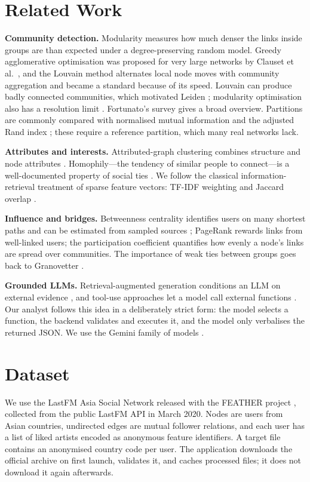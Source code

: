 \documentclass[conference]{IEEEtran}
\begin{document}
\section{Related Work}\label{sec:related}
\textbf{Community detection.} Modularity \cite{newman2006} measures how much denser the links inside groups are than expected under a degree-preserving random model. Greedy agglomerative optimisation was proposed for very large networks by Clauset et al.\ \cite{clauset2004}, and the Louvain method \cite{blondel2008} alternates local node moves with community aggregation and became a standard because of its speed. Louvain can produce badly connected communities, which motivated Leiden \cite{traag2019}; modularity optimisation also has a resolution limit \cite{fortunato2007}. Fortunato's survey \cite{fortunato2010} gives a broad overview. Partitions are commonly compared with normalised mutual information \cite{danon2005} and the adjusted Rand index \cite{hubert1985}; these require a reference partition, which many real networks lack.

\textbf{Attributes and interests.} Attributed-graph clustering combines structure and node attributes \cite{bothorel2015}. Homophily---the tendency of similar people to connect---is a well-documented property of social ties \cite{mcpherson2001}. We follow the classical information-retrieval treatment of sparse feature vectors: TF-IDF weighting \cite{salton1988} and Jaccard overlap \cite{jaccard1901}.

\textbf{Influence and bridges.} Betweenness centrality \cite{freeman1977} identifies users on many shortest paths and can be estimated from sampled sources \cite{brandes2007}; PageRank \cite{page1999} rewards links from well-linked users; the participation coefficient \cite{guimera2005} quantifies how evenly a node's links are spread over communities. The importance of weak ties between groups goes back to Granovetter \cite{granovetter1973}.

\textbf{Grounded LLMs.} Retrieval-augmented generation conditions an LLM on external evidence \cite{lewis2020}, and tool-use approaches let a model call external functions \cite{schick2023}. Our analyst follows this idea in a deliberately strict form: the model selects a function, the backend validates and executes it, and the model only verbalises the returned JSON. We use the Gemini family of models \cite{gemini2023}.

\section{Dataset}\label{sec:data}
We use the LastFM Asia Social Network released with the FEATHER project \cite{rozemberczki2020}, collected from the public LastFM API in March 2020. Nodes are users from Asian countries, undirected edges are mutual follower relations, and each user has a list of liked artists encoded as anonymous feature identifiers. A target file contains an anonymised country code per user. The application downloads the official archive on first launch, validates it, and caches processed files; it does not download it again afterwards.
\end{document}
